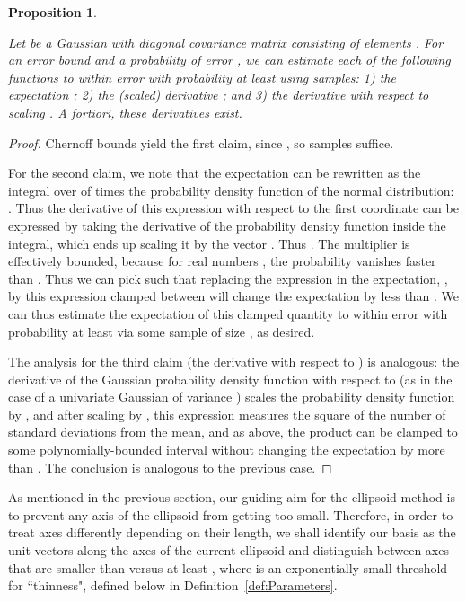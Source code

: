 \documentclass[11pt,letter]{article}
\newcounter{nTheorems}
\numberwithin{nTheorems}{section}
\newtheorem{proposition}[nTheorems]{Proposition}
\begin{document}
\begin{proposition}\label{prop:Sampling}

  Let  be a Gaussian with diagonal covariance matrix  consisting of elements .
  For an error bound  and a probability of error , we can estimate each of the following functions to within error  with probability at least  using  samples: 1) the expectation ; 2) the (scaled) derivative ; and 3) the derivative with respect to scaling . \emph{A fortiori}, these derivatives exist.
\end{proposition}
\begin{proof}

Chernoff bounds yield the first claim, since , so  samples suffice.

For the second claim, we note that the expectation can be rewritten as the integral over  of  times the probability density function of the normal distribution: . Thus the derivative of this expression with respect to the first coordinate  can be expressed by taking the derivative of the probability density function inside the integral, which ends up scaling it by the vector . Thus . The multiplier  is effectively bounded, because for real numbers , the probability  vanishes faster than . Thus we can pick  such that replacing the expression in the expectation, , by this expression clamped between  will change the expectation by less than . We can thus estimate the expectation of this clamped quantity to within error  with probability at least  via some sample of size , as desired.

The analysis for the third claim (the derivative with respect to ) is analogous: the derivative of the Gaussian probability density function with respect to  (as in the case of a univariate Gaussian of variance ) scales the probability density function by , and after scaling by , this expression measures the square of the number of standard deviations from the mean, and as above, the product  can be clamped to some polynomially-bounded interval  without changing the expectation by more than . The conclusion is analogous to the previous case.
\end{proof}
As mentioned in the previous section, our guiding aim for the ellipsoid method is to prevent any axis of the ellipsoid from getting too small.
Therefore, in order to treat axes differently depending on their length, we shall identify our basis as the unit vectors along the axes of the current ellipsoid and distinguish between axes that are smaller than  versus at least , where  is an exponentially small threshold for ``thinness", defined below in Definition~\ref{def:Parameters}.
\end{document}

